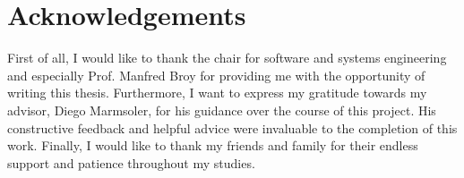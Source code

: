\documentclass[a4paper,12pt,twoside]{report}
\begin{document}
\setlength{\evensidemargin}{22pt}
\setlength{\oddsidemargin}{22pt}

\def\doctype{Bachelor's Thesis}
\def\faculty{Informatics}
\def\title{Simulation-Based Analysis of Blockchain Architectures}		
\def\titleGer{Simulationsbasierte Analyse von Blockchain Architekturen}
\def\supervisor{Prof. Dr. Dr. h.c. Manfred Broy}
\def\advisor{Diego Marmsoler}
\def\author{Leo Eichhorn}
\def\date{13.07.2018}



\lstset{showspaces=false, numbers=left, frame=single, basicstyle=\small}




\newpage
\thispagestyle{empty}
\mbox{}

\newpage
\thispagestyle{empty}
\mbox{}


\newpage
\thispagestyle{empty}
\mbox{}

\chapter*{Acknowledgements}
First of all, I would like to thank the chair for software and systems engineering and especially Prof. Manfred Broy for providing me with the opportunity of writing this thesis. Furthermore, I want to express my gratitude towards my advisor, Diego Marmsoler, for his guidance over the course of this project. His constructive feedback and helpful advice were invaluable to the completion of this work. Finally, I would like to thank my friends and family for their endless support and patience throughout my studies.
\clearpage
\end{document}

